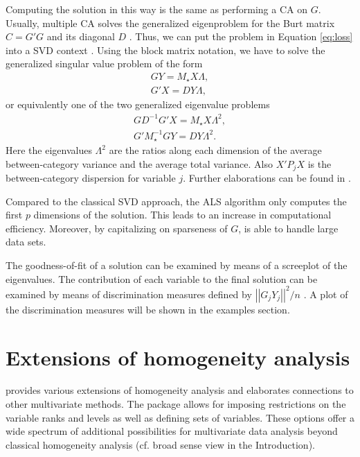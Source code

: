 \documentclass[article]{jss1}
\begin{document}
Computing the  solution in this way is the same as performing a CA on $G$. Usually, multiple CA solves the generalized eigenproblem for the Burt matrix $C=G'G$ and its diagonal \(D\) \citep{Greenacre:84,Greenacre+Blasius:06}.
Thus, we can put the problem in Equation \ref{eq:loss} into a SVD context \citep{deLeeuw+Michailides+Wang:99}. Using the block matrix notation, we have to solve the generalized singular value problem of the form
\begin{eqnarray}
GY=M_\star X\Lambda, \\
G'X=DY\Lambda,
\end{eqnarray}
or equivalently one of the two generalized eigenvalue problems
\begin{eqnarray}
GD^{-1}G'X=M_\star X\Lambda^2, \\
G'M_\star^{-1}GY=DY\Lambda^2.
\end{eqnarray}
Here the eigenvalues $\Lambda^2$ are the ratios along each dimension of the average between-category variance and the average total variance.
Also $X'P_jX$ is the between-category dispersion for variable $j$. Further elaborations can be found in \citet{Michailidis+deLeeuw:98}. 

Compared to the classical SVD approach, the ALS algorithm only computes the first $p$ dimensions of the solution. This leads to an increase in computational efficiency. Moreover, by capitalizing on sparseness of $G$,  is able to handle large data sets.

The goodness-of-fit of a solution can be examined by means of a screeplot of the eigenvalues. The contribution of each variable to the final solution can be examined by means of discrimination measures defined by $\left|\left|G_jY_j\right|\right|^2/n$ \citep[see][]{Meulman:1996}. A plot of the discrimination measures will be shown in the examples section.

\section{Extensions of homogeneity analysis}
\citet{Gifi:90} provides various extensions of homogeneity analysis and elaborates connections to other multivariate methods. The package  allows for imposing restrictions on the variable ranks and levels as well as defining sets of variables. These options offer a wide spectrum of additional possibilities for multivariate data analysis beyond classical homogeneity analysis (cf. broad sense view in the Introduction).
\end{document}
